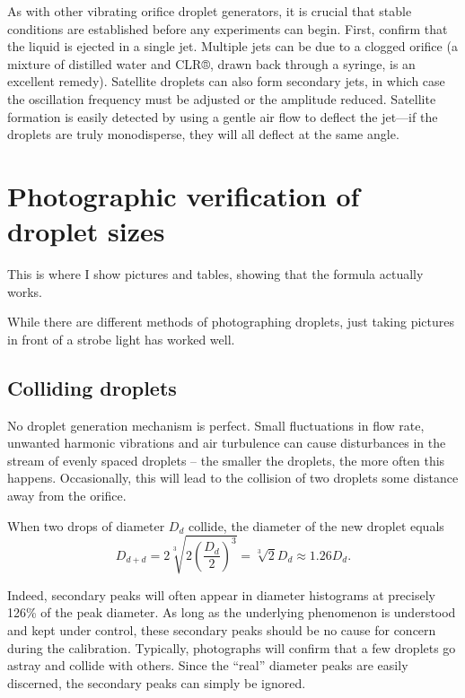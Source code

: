\documentclass[11.5pt]{book}
\begin{document}
As with other vibrating orifice droplet generators, it is crucial that stable
conditions are established before any experiments can begin. First, confirm that
the liquid is ejected in a single jet. Multiple jets can be due to a clogged
orifice (a mixture of distilled water and CLR®, drawn back through a
syringe, is an excellent remedy). Satellite droplets can also form secondary
jets, in which case the oscillation frequency must be adjusted or the amplitude
reduced. Satellite formation is easily detected by using a gentle air flow to
deflect the jet---if the droplets are truly monodisperse, they will all deflect
at the same angle.\cite{Strom69}


\section{Photographic verification of droplet sizes}
This is where I show pictures and tables, showing that the formula
actually works.

While there are different methods of photographing droplets, just taking
pictures in front of a strobe light has worked well.

\subsection{Colliding droplets}
\label{sec:droplet-collisions}
No droplet generation mechanism is perfect. Small fluctuations in flow rate,
unwanted harmonic vibrations and air turbulence can cause disturbances in the
stream of evenly spaced droplets -- the smaller the droplets, the more often
this happens. Occasionally, this will lead to the collision
of two droplets some distance away from the orifice.

When two drops of diameter $D_d$ collide, the diameter of the new droplet equals
\begin{equation}
    D_{d+d} = 2\sqrt[3]{2\left(\frac{D_d}{2}\right)^3} = \sqrt[3]{2} D_d \approx
    1.26 D_d.
\end{equation}

Indeed, secondary peaks will often appear in diameter histograms at precisely 126\% of
the peak diameter. As long as the underlying phenomenon is understood and kept
under control, these secondary peaks should be no cause for concern during the
calibration. Typically, photographs will confirm that a few droplets go astray
and collide with others. Since the ``real'' diameter peaks are easily discerned,
the secondary peaks can simply be ignored.
\end{document}
